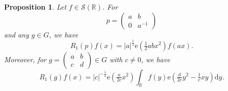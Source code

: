 \documentclass[12pt]{amsart}
\newtheorem{prop}[thm]{Proposition}
\theoremstyle{definition}
\theoremstyle{remark}
\numberwithin{equation}{section}
\newcommand{\dd}{\mathrm{d}}
\newcommand{\R}{\mathbb{R}}
\newcommand{\e}{\mathrm{e}}
\newcommand{\cS}{\mathcal{S}}
\begin{document}
\begin{prop}
  \label{prop:oscillator}
  Let $f\in\cS(\R)$.
  For 
  \begin{equation}
    \label{eq:poscillator}
    p =
    \begin{pmatrix}
      a & b \\
      0 & a^{-1}
    \end{pmatrix}
  \end{equation}
  and any $g \in G$, we have
  \begin{equation}
    \label{eq:poscillator1}
    R_1(p)f(x) = |a|^{\frac{1}{2}} \e( \tfrac{1}{2}  ab x^2) f(ax).
  \end{equation}
  Moreover, for $ g = 
  \begin{pmatrix}
    a & b \\
    c & d
  \end{pmatrix}
  \in G$ with $c \neq 0$, we have
  \begin{equation}
    \label{eq:Fouriertransform}
    R_1(g)f(x) = |c |^{-\frac{1}{2}} \e ( \tfrac{a}{2c}x^2) \int_{\R} f(y) \e( \tfrac{d}{2c}y^2 - \tfrac{1}{c} x y) \dd y.
  \end{equation}
\end{prop}
\end{document}

